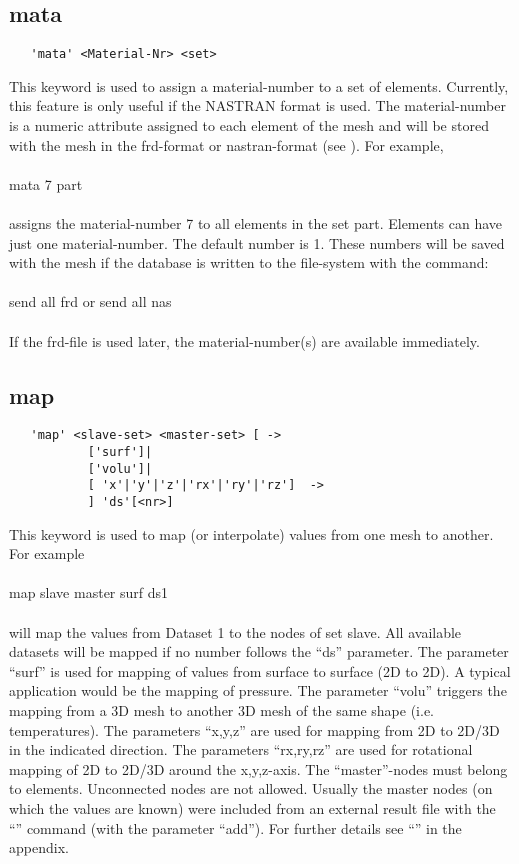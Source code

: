 \documentclass{article}
\begin{document}
\subsection{\label{mata}mata}
\begin{verbatim}
   'mata' <Material-Nr> <set> 
\end{verbatim}
This keyword is used to assign a material-number to a set of elements. Currently, this feature is only useful if the NASTRAN format is used. The material-number is a numeric attribute assigned to each element of the mesh and will be stored with the mesh in the frd-format or nastran-format (see ). For example,\\\\
mata 7 part\\\\
assigns the material-number 7 to all elements in the set part. Elements can have just one material-number. The default number is 1. These numbers will be saved with the mesh if the database is written to the file-system with the command:\\\\send all frd  or  send all nas\\\\If the frd-file is used later, the material-number(s) are available immediately.

\subsection{\label{map}map}
\begin{verbatim}
   'map' <slave-set> <master-set> [ ->
           ['surf']|
           ['volu']|
           [ 'x'|'y'|'z'|'rx'|'ry'|'rz']  ->
           ] 'ds'[<nr>]
\end{verbatim}
This keyword is used to map (or interpolate) values from one mesh to another. For example\\\\map slave master surf ds1\\\\will map the values from Dataset 1 to the nodes of set slave. All available datasets will be mapped if no number follows the ``ds'' parameter. The parameter ``surf'' is used for mapping of values from surface to surface (2D to 2D). A typical application would be the mapping of pressure. The parameter ``volu'' triggers the mapping from a 3D mesh to another 3D mesh of the same shape (i.e. temperatures). The parameters ``x,y,z'' are used for mapping from 2D to 2D/3D in the indicated direction. The parameters ``rx,ry,rz'' are used for rotational mapping of 2D to 2D/3D around the x,y,z-axis. The ``master''-nodes must belong to elements. Unconnected nodes are not allowed. Usually the master nodes (on which the values are known) were included from an external result file with the ``'' command (with the parameter ``add''). For further details see ``'' in the appendix.
\end{document}
